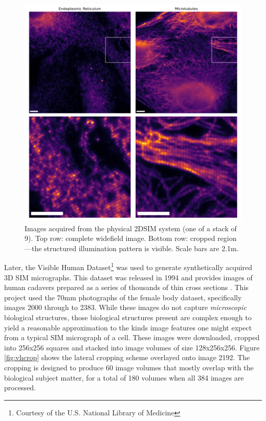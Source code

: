 \documentclass[12pt]{article}
\begin{document}
\begin{figure}[hbtp]
    \includegraphics[scale=0.53, center]{figures/2DSIM.png}
    \caption{Images acquired from the physical 2DSIM system (one of a stack of 9).
    Top row: complete widefield image. Bottom row: cropped region---the structured illumination pattern is visible.
    Scale bars are 2.1\textmu m.}
    \label{fig:2DSIM}
\end{figure}

Later, the Visible Human Dataset\footnote{Courtesy of the U.S. National Library of Medicine} was used to generate synthetically acquired 3D SIM micrographs.
This dataset was released in 1994 and provides images of human cadavers prepared as a series of thousands of thin cross sections \cite{vhdata}.
This project used the 70mm photographs of the female body dataset, specifically images 2000 through to 2383.
While these images do not capture \textit{microscopic} biological structures,
those biological structures present are complex enough to yield a reasonable approximation to the kinds image features one might expect from a typical SIM micrograph of a cell.
These images were downloaded, cropped into 256x256 squares and stacked into image volumes of size 128x256x256.
Figure \ref{fig:vhcrop} shows the lateral cropping scheme overlayed onto image 2192.
The cropping is designed to produce 60 image volumes that mostly overlap with the biological subject matter,
for a total of 180 volumes when all 384 images are processed.
\end{document}

